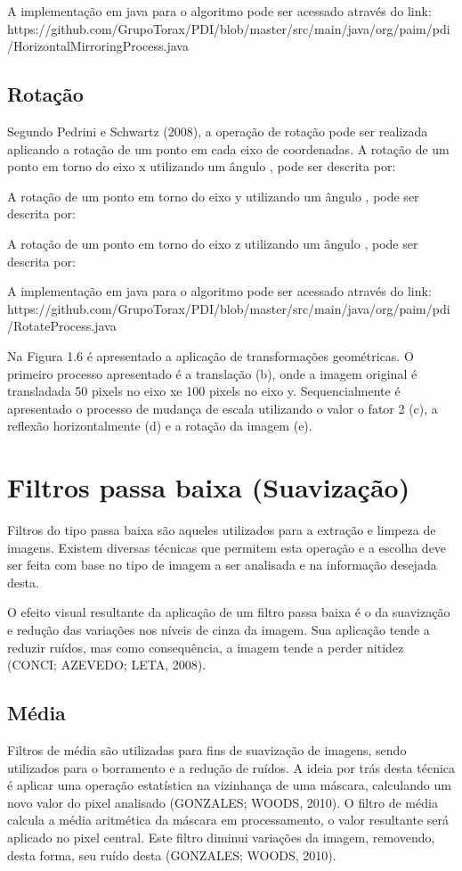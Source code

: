 \documentclass[
	12pt,				%
	oneside,			%
	a4paper,			%
	english,			%
	french,				%
	spanish,			%
	brazil,				%
	]{abntex2}
\begin{document}
A implementação em java para o algoritmo pode ser acessado através do link:
https://github.com/GrupoTorax/PDI/blob/master/src/main/java/org/paim/pdi/HorizontalMirroringProcess.java 

\subsection{Rotação}

Segundo Pedrini e Schwartz (2008), a operação de rotação pode ser realizada aplicando a rotação de um ponto em cada eixo de coordenadas. A rotação de um ponto em torno do eixo x utilizando um ângulo , pode ser descrita por:

A rotação de um ponto em torno do eixo y utilizando um ângulo , pode ser descrita por:

A rotação de um ponto em torno do eixo z utilizando um ângulo , pode ser descrita por:

A implementação em java para o algoritmo pode ser acessado através do link: https://github.com/GrupoTorax/PDI/blob/master/src/main/java/org/paim/pdi/RotateProcess.java

Na Figura 1.6 é apresentado a aplicação de transformações geométricas. O primeiro processo apresentado é a translação (b), onde a imagem original é transladada 50 pixels no eixo xe 100 pixels no eixo y. Sequencialmente é apresentado o processo de mudança de escala utilizando o valor o fator 2 (c), a reflexão horizontalmente (d) e a rotação da imagem (e). 

\section{Filtros passa baixa (Suavização)}
Filtros do tipo passa baixa são aqueles utilizados para a extração e limpeza de imagens. Existem diversas técnicas que permitem esta operação e a escolha deve ser feita com base no tipo de imagem a ser analisada e na informação desejada desta. 

O efeito visual resultante da aplicação de um filtro passa baixa é o da suavização e redução das variações nos níveis de cinza da imagem. Sua aplicação tende a reduzir ruídos, mas como consequência, a imagem tende a perder nitidez (CONCI; AZEVEDO; LETA, 2008).

\subsection{Média}
Filtros de média são utilizadas para fins de suavização de imagens, sendo utilizados para o borramento e a redução de ruídos. A ideia por trás desta técnica é aplicar uma operação estatística na vizinhança de uma máscara, calculando um novo valor do pixel analisado (GONZALES; WOODS, 2010). 
O filtro de média calcula a média aritmética da máscara em processamento, o valor resultante será aplicado no pixel central. Este filtro diminui variações da imagem, removendo, desta forma, seu ruído desta (GONZALES; WOODS, 2010).
\end{document}
